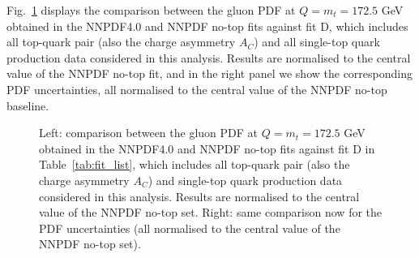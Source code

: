 \documentclass[withindex,glossary]{cam-thesis}
\begin{document}
Fig.~\ref{fig:fitD_gluon}
displays the comparison between the gluon PDF at $Q=m_t=172.5$ GeV obtained
in the NNPDF4.0 and NNPDF no-top fits against fit D, which includes all top-quark
pair (also the charge asymmetry $A_C$) and all single-top quark production
data considered in this analysis.
%
Results are normalised to the central value of the NNPDF no-top fit,
and in the right panel we show the corresponding PDF uncertainties, all 
normalised to the central value of the NNPDF no-top baseline. 
%
\begin{figure}[t]
\centering
        \caption{Left: comparison between the gluon PDF at $Q=m_t=172.5$ GeV
          obtained in the NNPDF4.0 and NNPDF no-top fits
          against fit D in Table~\ref{tab:fit_list}, which includes all
          top-quark
          pair (also the charge asymmetry $A_C$)
          and single-top quark production data considered in this analysis.
          Results are normalised to the central value of the NNPDF no-top set.
          Right: same comparison now for the PDF uncertainties (all
          normalised to the central value of the NNPDF no-top set).
}
\label{fig:fitD_gluon}
\end{figure}
\end{document}
